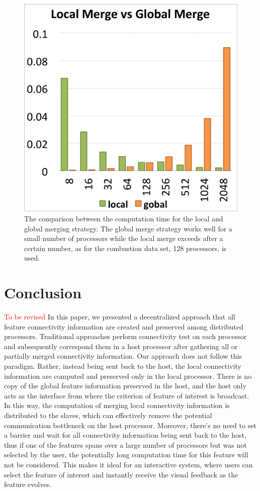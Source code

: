 \documentclass[10pt, conference, compsocconf]{IEEEtran}
\begin{document}
\begin{figure}[ht]
	\centering
	\includegraphics[width=0.45\linewidth]{local_vs_global.png}
	\caption{The comparison between the computation time for the local and global merging strategy. The global merge strategy works well for a small number of processors while the local merge exceeds after a certain number, as for the combustion data set, 128 processors, is used.}
	\label{fig:local-vs-global}
\end{figure}


\section{Conclusion}
\textcolor{red}{To be revised}
In this paper, we presented a decentralized approach that all feature connectivity information are created and preserved among distributed processors. Traditional approaches perform connectivity test on each processor and subsequently correspond them in a host processor after gathering all or partially merged connectivity information. Our approach does not follow this paradigm. Rather, instead being sent back to the host, the local connectivity information are computed and preserved only in the local processor. 
There is no copy of the global feature information preserved in the host, and the host only acts as the interface from where the criterion of feature of interest is broadcast. In this way, the computation of merging local connectivity information is distributed to the slaves, which can effectively remove the potential communication bottleneck on the host processor. 
Moreover, there's no need to set a barrier and wait for all connectivity information being sent back to the host, thus if one of the features spans over a large number of processors but was not selected by the user, the potentially long computation time for this feature will not be considered. This makes it ideal for an interactive system, where users can select the feature of interest and instantly receive the visual feedback as the feature evolves.





\end{document}
